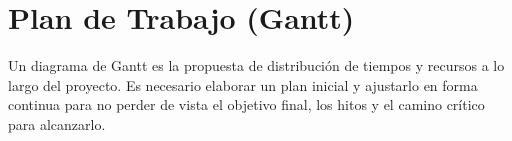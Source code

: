 \section{Plan de Trabajo (Gantt)}
    Un diagrama de Gantt es la propuesta de distribución de tiempos y recursos a
    lo largo del proyecto. Es necesario elaborar un plan inicial y ajustarlo en
    forma continua para no perder de vista el objetivo final, los hitos y el
    camino crítico para alcanzarlo.



